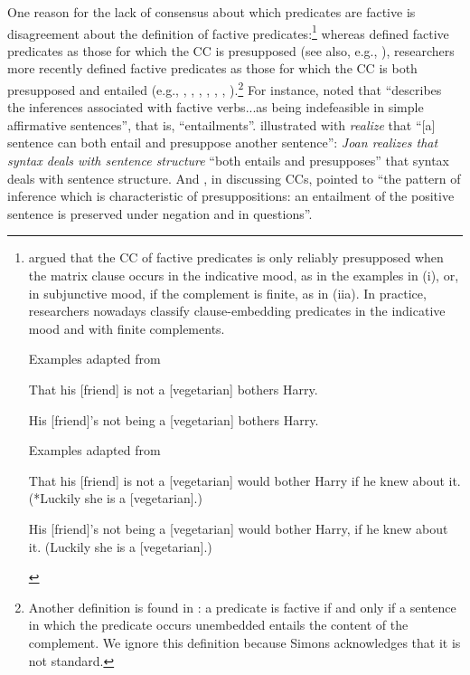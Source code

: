 \documentclass[11pt,fleqn]{article}
\newcommand{\6}{\mbox{$[\hspace*{-.6mm}[$}}
\newcommand{\9}{\mbox{$]\hspace*{-.6mm}]$}}
\begin{document}
One reason for the lack of consensus about which predicates are factive is disagreement about the definition of factive predicates:\footnote{\citet[56]{karttunen71b} argued that the CC of factive predicates is only reliably presupposed when the matrix clause occurs in the indicative mood, as in the examples in (i), or, in subjunctive mood, if the complement is finite, as in (iia). In practice, researchers nowadays classify clause-embedding predicates in the indicative mood and with finite complements.

\begin{exe}
 Examples adapted from \citealt[60]{karttunen71b}
\begin{xlist}
\ex That his [friend] is not a [vegetarian] bothers Harry. 

\ex His [friend]'s not being a [vegetarian] bothers Harry.

\end{xlist}
 Examples adapted from \citealt[60f.]{karttunen71b}
\begin{xlist}
\ex That his [friend] is not a [vegetarian] would bother Harry if he knew about it. (*Luckily she is a [vegetarian].)

\ex His [friend]'s not being a [vegetarian] would bother Harry, if he knew about it. (Luckily she is a [vegetarian].)

\end{xlist}
\end{exe}
} whereas \citealt{kiparsky-kiparsky70} defined factive predicates as those for which the CC is presupposed (see also, e.g., \citealt{karttunen71-implicative,karttunen71b}), researchers more recently defined factive predicates as those for which the CC is both presupposed and entailed (e.g., \citealt[119-123]{gazdar79a}, \citealt[355]{ccmg90}, \citealt[345]{vds92},  \citealt[3]{abbott06}, \citealt[139]{schlenker10}, \citealt[77]{anand-hacquard2014}, \citealt[fn.7]{spector-egre2015}).\footnote{Another definition is found in \citealt[1043]{simons07}: a predicate is factive if and only if a sentence in which the predicate occurs unembedded entails the content of the complement. We ignore this definition  because Simons acknowledges that it is not standard. } For instance, \citet[66f.]{beaver01} noted that \citet[119-123]{gazdar79a} ``describes the inferences associated with factive verbs...as being indefeasible in simple affirmative sentences'', that is, ``entailments''. \citet[355]{ccmg90} illustrated with {\em realize} that ``[a] sentence can both entail and presuppose another sentence'': {\em Joan realizes that syntax deals with sentence structure} ``both entails and presupposes'' that syntax deals with sentence structure. And \citet[139]{schlenker10}, in discussing CCs, pointed to ``the pattern of inference which is characteristic of presuppositions: an entailment of the positive sentence is preserved under negation and in questions''.
\end{document}
